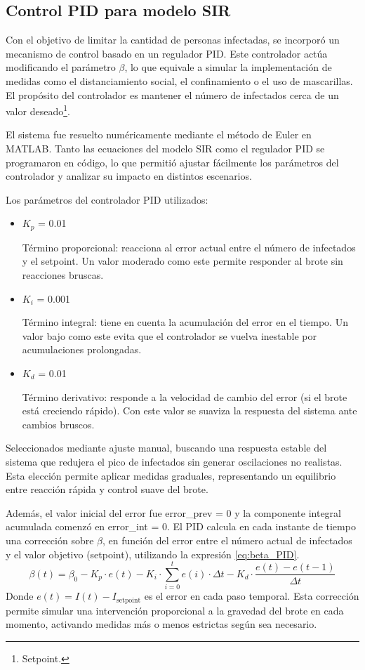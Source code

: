 \subsection{Control PID para modelo SIR}
Con el objetivo de limitar la cantidad de personas infectadas, se incorporó un mecanismo de control basado en un regulador PID. Este controlador actúa modificando el parámetro $\beta$, lo que equivale a simular la implementación de medidas como el distanciamiento social, el confinamiento o el uso de mascarillas. El propósito del controlador es mantener el número de infectados cerca de un valor deseado\footnote{Setpoint.}.

El sistema fue resuelto numéricamente mediante el método de Euler en MATLAB. Tanto las ecuaciones del modelo SIR como el regulador PID se programaron en código, lo que permitió ajustar fácilmente los parámetros del controlador y analizar su impacto en distintos escenarios.

Los parámetros del controlador PID utilizados:
\begin{itemize}
    \item $K_p$ = 0.01

    Término proporcional: reacciona al error actual entre el número de infectados y el setpoint.
    Un valor moderado como este permite responder al brote sin reacciones bruscas.
    \item $K_i$ = 0.001

    Término integral: tiene en cuenta la acumulación del error en el tiempo.
    Un valor bajo como este evita que el controlador se vuelva inestable por acumulaciones prolongadas.
    \item $K_d$ = 0.01

    Término derivativo: responde a la velocidad de cambio del error (si el brote está creciendo rápido).
Con este valor se suaviza la respuesta del sistema ante cambios bruscos.
\end{itemize}
Seleccionados mediante ajuste manual, buscando una respuesta estable del sistema que redujera el pico de infectados sin generar oscilaciones no realistas. Esta elección permite aplicar medidas graduales, representando un equilibrio entre reacción rápida y control suave del brote.

Además, el valor inicial del error fue error\_prev = 0 y la componente integral acumulada comenzó en error\_int = 0. El PID calcula en cada instante de tiempo una corrección sobre $\beta$, en función del error entre el número actual de infectados y el valor objetivo (setpoint), utilizando la expresión \eqref{eq:beta_PID}.
\begin{equation}
\beta(t) = \beta_0 - K_p \cdot e(t) - K_i \cdot \sum_{i=0}^{t} e(i) \cdot \Delta t - K_d \cdot \frac{e(t) - e(t - 1)}{\Delta t}
\label{eq:beta_PID}
\end{equation}
Donde $e(t) = I(t) - I_{\text{setpoint}}$ es el error en cada paso temporal. Esta corrección permite simular una intervención proporcional a la gravedad del brote en cada momento, activando medidas más o menos estrictas según sea necesario.

